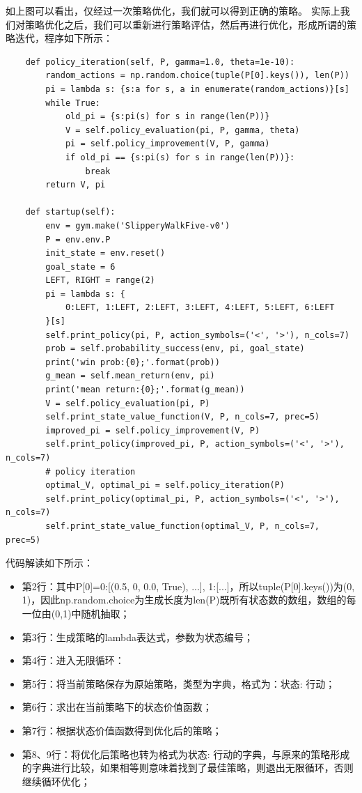 如上图可以看出，仅经过一次策略优化，我们就可以得到正确的策略。
实际上我们对策略优化之后，我们可以重新进行策略评估，然后再进行优化，形成所谓的策略迭代，程序如下所示：
\begin{lstlisting}
    def policy_iteration(self, P, gamma=1.0, theta=1e-10):
        random_actions = np.random.choice(tuple(P[0].keys()), len(P))
        pi = lambda s: {s:a for s, a in enumerate(random_actions)}[s]
        while True:
            old_pi = {s:pi(s) for s in range(len(P))}
            V = self.policy_evaluation(pi, P, gamma, theta)
            pi = self.policy_improvement(V, P, gamma)
            if old_pi == {s:pi(s) for s in range(len(P))}:
                break
        return V, pi

    def startup(self):
        env = gym.make('SlipperyWalkFive-v0')
        P = env.env.P
        init_state = env.reset()
        goal_state = 6
        LEFT, RIGHT = range(2)
        pi = lambda s: {
            0:LEFT, 1:LEFT, 2:LEFT, 3:LEFT, 4:LEFT, 5:LEFT, 6:LEFT
        }[s]
        self.print_policy(pi, P, action_symbols=('<', '>'), n_cols=7)
        prob = self.probability_success(env, pi, goal_state)
        print('win prob:{0};'.format(prob))
        g_mean = self.mean_return(env, pi)
        print('mean return:{0};'.format(g_mean))
        V = self.policy_evaluation(pi, P)
        self.print_state_value_function(V, P, n_cols=7, prec=5)
        improved_pi = self.policy_improvement(V, P)
        self.print_policy(improved_pi, P, action_symbols=('<', '>'), n_cols=7)
        # policy iteration
        optimal_V, optimal_pi = self.policy_iteration(P)
        self.print_policy(optimal_pi, P, action_symbols=('<', '>'), n_cols=7)
        self.print_state_value_function(optimal_V, P, n_cols=7, prec=5)
\end{lstlisting}
代码解读如下所示：
\begin{itemize}
    \item 第2行：其中P[0]={0:[(0.5, 0, 0.0, True), ...], 1:[...]}，所以tuple(P[0].keys())为(0, 1)，因此np.random.choice为生成长度为len(P)既所有状态数的数组，数组的每一位由(0,1)中随机抽取；
    \item 第3行：生成策略的lambda表达式，参数为状态编号；
    \item 第4行：进入无限循环：
    \item 第5行：将当前策略保存为原始策略，类型为字典，格式为：{状态: 行动}；
    \item 第6行：求出在当前策略下的状态价值函数；
    \item 第7行：根据状态价值函数得到优化后的策略；
    \item 第8、9行：将优化后策略也转为格式为{状态: 行动}的字典，与原来的策略形成的字典进行比较，如果相等则意味着找到了最佳策略，则退出无限循环，否则继续循环优化；
\end{itemize}
